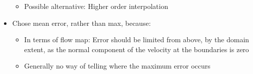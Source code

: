 \begin{framed}
\begin{itemize}
            \begin{itemize}
                \item Possible alternative: Higher order interpolation
            \end{itemize}
            \item Chose mean error, rather than max, because:
                \begin{itemize}
                    \item In terms of flow map: Error should be limited from above, by the domain extent, as the normal component
                        of the velocity at the boundaries is zero
                        \item Generally no way of telling where the maximum error occurs
                \end{itemize}
    \end{itemize}
\end{framed}
